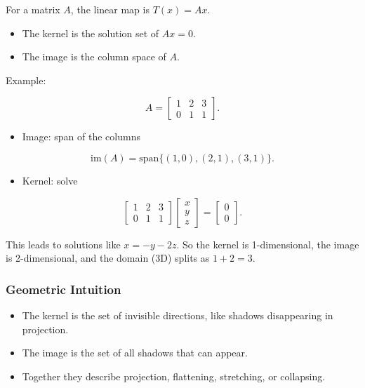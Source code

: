 \documentclass[
  letterpaper,
  DIV=11,
  numbers=noendperiod]{scrreprt}
\providecommand{\tightlist}{%
  \setlength{\itemsep}{0pt}\setlength{\parskip}{0pt}}
\begin{document}
For a matrix \(A\), the linear map is \(T(x) = Ax\).

\begin{itemize}
\tightlist
\item
  The kernel is the solution set of \(Ax = 0\).
\item
  The image is the column space of \(A\).
\end{itemize}

Example:

\[
A = \begin{bmatrix} 1 & 2 & 3 \\ 0 & 1 & 1 \end{bmatrix}.
\]

\begin{itemize}
\tightlist
\item
  Image: span of the columns
\end{itemize}

\[
\text{im}(A) = \text{span}\{ (1,0), (2,1), (3,1) \}.
\]

\begin{itemize}
\tightlist
\item
  Kernel: solve
\end{itemize}

\[
\begin{bmatrix} 1 & 2 & 3 \\ 0 & 1 & 1 \end{bmatrix} \begin{bmatrix} x \\ y \\ z \end{bmatrix} = \begin{bmatrix} 0 \\ 0 \end{bmatrix}.
\]

This leads to solutions like \(x=-y-2z\). So the kernel is
1-dimensional, the image is 2-dimensional, and the domain (3D) splits as
\(1+2=3\).

\subsubsection{Geometric Intuition}\label{geometric-intuition-3}

\begin{itemize}
\tightlist
\item
  The kernel is the set of invisible directions, like shadows
  disappearing in projection.
\item
  The image is the set of all shadows that can appear.
\item
  Together they describe projection, flattening, stretching, or
  collapsing.
\end{itemize}
\end{document}
